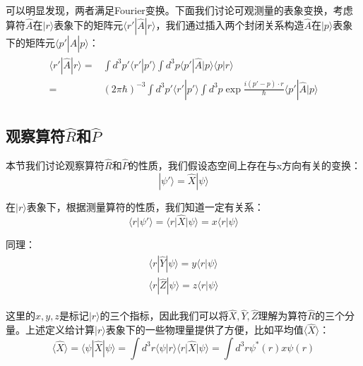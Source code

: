         可以明显发现，两者满足Fourier变换。下面我们讨论可观测量的表象变换，考虑算符$\hat{A}$在$|r\rangle$表象下的矩阵元$\langle r'|\hat{A}|r\rangle$，我们通过插入两个封闭关系构造$\hat{A}$在$|p\rangle$表象下的矩阵元$\langle p'|\hat{A}|p\rangle$：
        \begin{align}
            \begin{split}
                \langle r'|\hat{A}|r\rangle=&\int d^3p'\langle r'|p'\rangle\int d^3p\langle p'|\hat{A}|p\rangle\langle p|r\rangle
                \\=&(2\pi\hbar)^{-3}\int d^3p'\langle r'|p'\rangle\int d^3p \exp{\frac{i(p'-p)\cdot r}{\hbar}}\langle p'|\hat{A}|p\rangle
            \end{split}
        \end{align}
    \subsection{观察算符$\hat{R}$和$\hat{P}$}
        本节我们讨论观察算符$\hat{R}$和$\hat{P}$的性质，我们假设态空间上存在与x方向有关的变换：
        \begin{equation}
            |\psi'\rangle=\hat{X}|\psi\rangle
        \end{equation}
        
        在$|r\rangle$表象下，根据测量算符的性质，我们知道一定有关系：
        \begin{equation}
            \langle r|\psi'\rangle=\langle r|\hat{X}|\psi\rangle= x\langle r|\psi\rangle
        \end{equation}
        
        同理：
        \begin{align}
            \begin{split}
                \langle r|\hat{Y}|\psi\rangle= y\langle r|\psi\rangle\\
                \langle r|\hat{Z}|\psi\rangle= z\langle r|\psi\rangle
            \end{split}
        \end{align}
        
        这里的$x,y,z$是标记$|r\rangle$的三个指标，因此我们可以将$\hat{X},\hat{Y},\hat{Z}$理解为算符$\hat{R}$的三个分量。上述定义给计算$|r\rangle$表象下的一些物理量提供了方便，比如平均值$\langle \hat{X}\rangle$：
        \begin{equation}
            \langle \hat{X}\rangle=\langle\psi|\hat{X}|\psi\rangle=\int d^3r\langle\psi|r\rangle\langle r|\hat{X}|\psi\rangle=\int d^3r\psi^*(r)x\psi(r)
        \end{equation}
 
